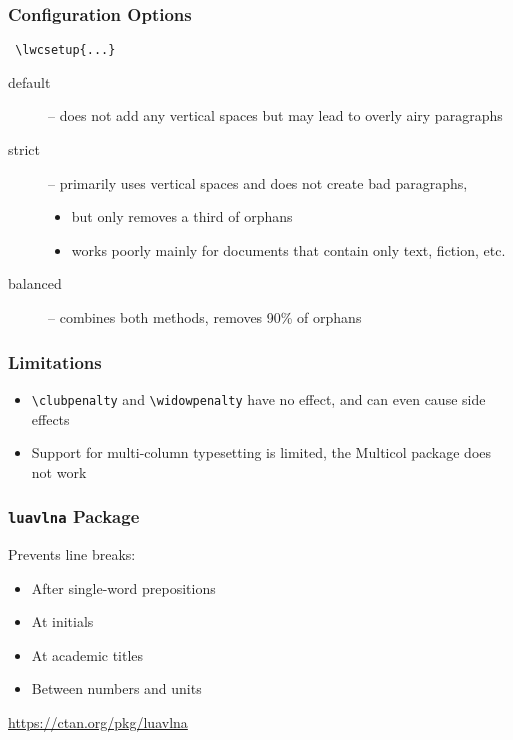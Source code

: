 \begin{frame}[fragile]
  \frametitle{Configuration Options}
 \begin{verbatim}
 \lwcsetup{...}
 \end{verbatim}
 \begin{description}
   \item[default] -- does not add any vertical spaces but may lead to overly airy paragraphs
   \item[strict] -- primarily uses vertical spaces and does not create bad paragraphs,  
     \begin{itemize}
       \item but only removes a third of orphans
       \item works poorly mainly for documents that contain only text, fiction, etc.
     \end{itemize}
   \item[balanced] -- combines both methods, removes 90\% of orphans
  \end{description}
\end{frame}

\begin{frame}[fragile]
  \frametitle{Limitations}
    \begin{itemize}
      \item \verb|\clubpenalty| and \verb|\widowpenalty| have no effect, and can even cause side effects
      \item Support for multi-column typesetting is limited, the Multicol package does not work
  \end{itemize}
\end{frame}

\begin{frame}[fragile]
  \frametitle{\texttt{luavlna} Package}
    Prevents line breaks:
      \begin{itemize}
        \item After single-word prepositions
        \item At initials
        \item At academic titles
        \item Between numbers and units
      \end{itemize}
  \url{https://ctan.org/pkg/luavlna}
\end{frame}


